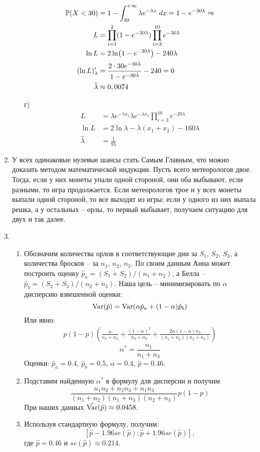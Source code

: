 \begin{enumerate}
\begin{enumerate}
\begin{align*}
\P(X<30)&=1-\int^{+\infty}_{30}\lambda e^{-\lambda x} \; dx=1-e^{-30\lambda} \Rightarrow\\
L&=\prod^{2}_{i=1}(1-e^{-30\lambda})\prod^{10}_{i=3}e^{-30\lambda}\\
\ln L&=2\ln (1-e^{-30\lambda})-240\lambda\\
(\ln L)'_\lambda&=\frac{2\cdot30e^{-30\hat{\lambda}}}{1-e^{-30\hat{\lambda}}}-240=0\\
\hat{\lambda}&\approx0,0074
\end{align*}
\item[г)]
\begin{align*}
L&=\lambda e^{-\lambda x_1}\lambda e^{-\lambda x_2}\prod^{10}_{i=3}e^{-20\lambda}\\
\ln L&=2\ln \lambda-\lambda(x_1+x_2)-160\lambda\\
\hat{\lambda}&=\frac{1}{95}
\end{align*}
\end{enumerate}
\item У всех одинаковые нулевые шансы стать Самым Главным, 
что можно доказать методом математической индукции. 
Пусть всего метеорологов двое. Тогда, если у них монеты
упали одной стороной, они оба выбывают, если разными, то игра продолжается. 
Если метеорологов трое и у всех монеты выпали одной стороной, то все выходят из игры;
если у одного из них выпала решка, а у остальных – орлы, то первый выбывает, 
получаем ситуацию для двух и так далее.
\item
\begin{enumerate}
\item Обозначим количества орлов в соответствующие дни за $S_1$, $S_2$, $S_3$,
а количества бросков – за $n_1$, $n_2$, $n_3$. По своим данным Анна может построить
оценку $\hat{p}_a=(S_1+S_2)/(n_1+n_2)$, а Белла – $\hat{p}_b=(S_2+S_3)/(n_2+n_3)$.
Наша цель – минимизировать по $\alpha$ дисперсию взвешенной оценки:
\[\Var(\hat{p})=\Var(\alpha\hat{p}_a+(1-\alpha)\hat{p}_b)\]
Или явно:
\begin{align*}
    p(1 - p)\left(\frac{\alpha}{n_1 + n_2} + \frac{(1 - \alpha)^2}{n_2 + n_3} +
    \frac{2\alpha(1 - \alpha)n_2}{(n_1 + n_2)(n_2 + n_3)}\right)
\end{align*}
\[
\alpha^*=\frac{n_1}{n_1+n_3}
\]
Оценки: $\hat{p}_a=0.4$, $\hat{p}_b=0.5$, $\alpha=0.4$, $\hat{p}=0.46$.

\item Подставим найденную $\alpha^*$ в формулу для дисперсии и получим
\[
\frac{n_1n_2+n_2n_3+n_1n_3}{(n_1+n_2)(n_1+n_3)(n_2+n_3)}p(1-p)
\]
При наших данных $\hat{\Var}(\hat{p})\approx0.0458$.

\item Используя стандартную формулу, получим:
\[
[\hat{p}-1.96se(\hat{p});\hat{p}+1.96se(\hat{p})],
\]
где $\hat{p}=0.46$ и $se(\hat{p})\approx0.214$.
\end{enumerate}
\end{enumerate}



